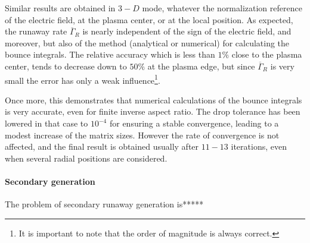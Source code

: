 Similar results are obtained in $3-D$ mode, whatever the normalization
reference of the electric field, at the plasma center, or at the local
position. As expected, the runaway rate $\overline{\Gamma }_{R}$ is nearly
independent of the sign of the electric field, and moreover, but also of the
method (analytical or numerical) for calculating the bounce integrals. The
relative accuracy which is less than $1\%$ close to the plasma center, tends
to decrease down to $50\%$ at the plasma edge, but since $\overline{\Gamma }%
_{R}$ is very small the error has only a weak influence\footnote{%
It is important to note that the order of magnitude is always correct.}.


Once more, this demonstrates that numerical calculations of the bounce
integrals is very accurate, even for finite inverse aspect ratio. The drop
tolerance has been lowered in that case to $10^{-4}$ for ensuring a stable
convergence, leading to a modest increase of the matrix sizes. However the
rate of convergence is not affected, and the final result is obtained
usually after $11-13$ iterations, even when several radial positions are
considered.

\paragraph{Secondary generation}

The problem of secondary runaway generation is*****
